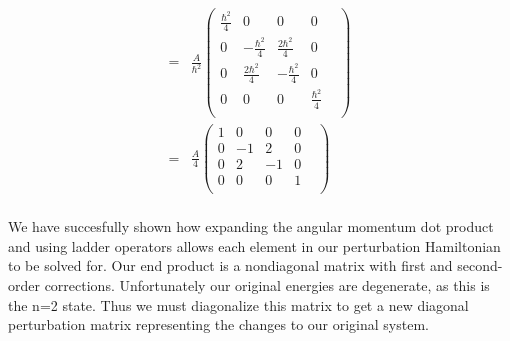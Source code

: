 \documentclass[10pt]{article} %
\begin{document}
\begin{align*}
  = & \frac{A}{\hbar^2}
  \begin{pmatrix}
    \frac{\hbar^2}{4}&
    0&
    0&
    0&\\
    0&
    -\frac{\hbar^2}{4}&
    \frac{2\hbar^2}{4}&
    0&\\
    0&
    \frac{2\hbar^2}{4}&
    -\frac{\hbar^2}{4}&
    0&\\
    0&
    0&
    0&
    \frac{\hbar^2}{4} &\\
  \end{pmatrix}\\
  = & \frac{A}{4}
  \begin{pmatrix}
    1&
    0&
    0&
    0&\\
    0&
    -1&
    2&
    0&\\
    0&
    2&
    -1&
    0&\\
    0&
    0&
    0&
    1&\\
  \end{pmatrix}\\
\end{align*}

We have succesfully shown how expanding the angular momentum dot product and using ladder
operators allows each element in our perturbation Hamiltonian to be solved for. Our end
product is a nondiagonal matrix with first and second-order corrections. Unfortunately our
original energies are degenerate, as this is the n=2 state. Thus we must diagonalize this
matrix to get a new diagonal perturbation matrix representing the changes to our original
system.\\
\end{document}

